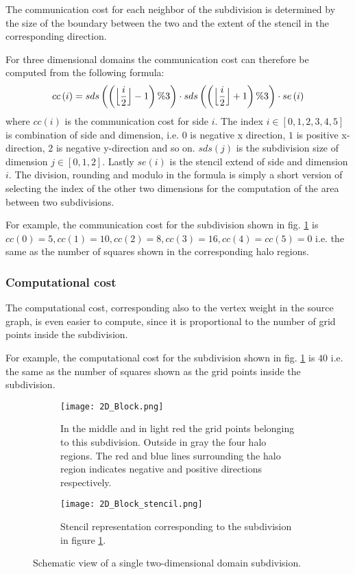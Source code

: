 The communication cost for each neighbor of the subdivision is determined by the size of the boundary between the two and the extent of the stencil in the corresponding direction.

For three dimensional domains the communication cost can therefore be computed from the following formula:
\begin{equation}
cc\left(i\right) = sds\left(\left(\floor[\Big]{\frac{i}{2}} - 1\right) \% 3 \right) \cdot sds\left(\left(\floor[\Big]{\frac{i}{2}} + 1\right) \% 3 \right) \cdot se\left(i\right)
\end{equation}
where $cc\left(i\right)$ is the communication cost for side $i$.
The index $i \in \left[0, 1, 2, 3, 4, 5\right]$ is combination of side and dimension, i.e. $0$ is negative x direction, $1$ is positive x-direction, $2$ is negative y-direction and so on.
$sds\left(j\right)$ is the subdivision size of dimension $j \in \left[0,1,2\right]$.
Lastly $se\left(i\right)$ is the stencil extend of side and dimension $i$.
The division, rounding and modulo in the formula is simply a short version of selecting the index of the other two dimensions for the computation of the area between two subdivisions.

For example, the communication cost for the subdivision shown in fig. \ref{fig:2DBlock} is $cc\left(0\right) = 5, cc\left(1\right) = 10, cc\left(2\right) = 8, cc\left(3\right) = 16, cc\left(4\right) = cc\left(5\right) = 0$ i.e. the same as the number of squares shown in the corresponding halo regions.

\subsubsection{Computational cost}
\label{sec:compcost}
The computational cost, corresponding also to the vertex weight in the source graph, is even easier to compute, since it is proportional to the number of grid points inside the subdivision.

For example, the computational cost for the subdivision shown in fig. \ref{fig:2DBlock} is $40$ i.e. the same as the number of squares shown as the grid points inside the subdivision.

\begin{figure}[!htbp]
\centering
\begin{subfigure}{0.8\textwidth}
  \centering
  \texttt{[image: 2D\_Block.png]}
  \caption{In the middle and in light red the grid points belonging to this subdivision.
Outside in gray the four halo regions.
The red and blue lines surrounding the halo region indicates negative and positive directions respectively.}
  \label{fig:2DBlock}
\end{subfigure}%
\begin{subfigure}{0.2\textwidth}
  \centering
  \texttt{[image: 2D\_Block\_stencil.png]}
  \caption{Stencil representation corresponding to the subdivision in figure \ref{fig:2DBlock}.}
  \label{fig:2DBlockStencil}
\end{subfigure}
\caption{Schematic view of a single two-dimensional domain subdivision.}
\label{fig:2D_subdivision}
\end{figure}

